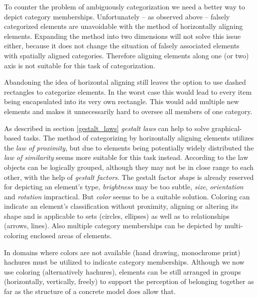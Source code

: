 \documentclass[twoside, openright, 12pt]{book}
\begin{document}
\noindent
To counter the problem of ambiguously categorization we need a better way to depict category memberships.
Unfortunately -- as observed above -- falsely categorized elements are unavoidable with the method of horizontally aligning elements.
Expanding the method into two dimensions will not solve this issue either, because it does not change the situation of falsely associated elements with spatially aligned categories.
Therefore aligning elements along one (or two) axis is not suitable for this task of categorization.

Abandoning the idea of horizontal aligning still leaves the option to use dashed rectangles to categorize elements.
In the worst case this would lead to every item being encapsulated into its very own rectangle.
This would add multiple new elements and makes it unnecessarily hard to oversee all members of one category.

As described in section \ref{gestalt_laws} \textit{gestalt laws} can help to solve graphical-based tasks.
The method of categorizing by horizontally aligning elements utilizes the \textit{law of proximity}, but due to elements being potentially widely distributed the \textit{law of similarity} seems more suitable for this task instead.
According to the law objects can be logically grouped, although they may not be in close range to each other, with the help of \textit{gestalt factors}.
The gestalt factor \textit{shape} is already reserved for depicting an element's type, \textit{brightness} may be too subtle, \textit{size}, \textit{orientation} and \textit{rotation} impractical.
But \textit{color} seems to be a suitable solution.
Coloring can indicate an element's classification without proximity, aligning or altering its shape and is applicable to sets (circles, ellipses) as well as to relationships (arrows, lines).
Also multiple category memberships can be depicted by multi-coloring enclosed areas of elements.

In domains where colors are not available (hand drawing, monochrome print) hachures must be utilized to indicate category memberships.
Although we now use coloring (alternatively hachures), elements can be still arranged in groups (horizontally, vertically, freely) to support the perception of belonging together as far as the structure of a concrete model does allow that.
\end{document}
